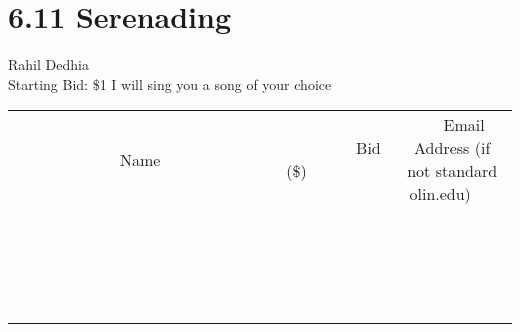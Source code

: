 \documentclass[11pt]{article}
\begin{document}
\section*{6.11 Serenading}
Rahil Dedhia
\\
Starting Bid: \$1
\newline
I will sing you a song of your choice
\\[3ex]
\begin{tabular}{c c c}
~~~~~~~~~~~~~Name~~~~~~~~~~~~~ & ~~~~~~~~~Bid (\$)~~~~~~~~~  & ~~~Email Address (if not standard olin.edu)~~~\\
 & & \\
\hline
 & & \\
\hline
 & & \\
\hline
 & & \\
\hline
 & & \\
\hline
 & & \\
\hline
 & & \\
\hline
 & & \\
\hline
 & & \\
\hline
 & & \\
\hline
 & & \\
\hline
 & & \\
\hline
 & & \\
\hline
 & & \\
\hline
 & & \\
\hline
 & & \\
\hline
 & & \\
\hline
 & & \\
\hline
 & & \\
\hline
\end{tabular}
\newpage
\end{document}
